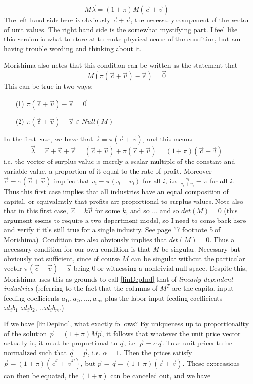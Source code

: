 \documentclass{article}
\theoremstyle{definition}
\theoremstyle{plain}
\theoremstyle{theorem}
\begin{document}
\[ M\vec{\lambda} = (1+\pi)M(\vec{c}+\vec{v}) \]
The left hand side here is obviously $\vec{c}+\vec{v}$, the necessary component of the vector of unit values. The right hand side is the somewhat mystifying part. I feel like this version is what to stare at to make physical sense of the condition, but am having trouble wording and thinking about it. \par 
Morishima also notes that this condition can be written as the statement that 
\[ M(\pi(\vec{c}+\vec{v})-\vec{s}) = \vec{0} \label{linDepInd} \]
This can be true in two ways:
\begin{itemize}
	\item[(1)] $\pi(\vec{c}+\vec{v})-\vec{s} = \vec{0}$ \\
	\item[(2)] $\pi(\vec{c}+\vec{v})-\vec{s} \in Null(M)$ 
\end{itemize}
In the first case, we have that $\vec{s} = \pi(\vec{c}+\vec{v})$, and this means
\[ \vec{\lambda} = \vec{c}+\vec{v}+\vec{s} = (\vec{c}+\vec{v}) + \pi(\vec{c}+\vec{v}) = (1+\pi)(\vec{c}+\vec{v}) \]
i.e. the vector of surplus value is merely a scalar multiple of the constant and variable value, a proportion of it equal to the rate of profit. Moreover $\vec{s} = \pi(\vec{c}+\vec{v})$ implies that $s_i = \pi(c_i+v_i)$ for all $i$, i.e. $\frac{s_i}{c_i+v_i} = \pi$ for all $i$. Thus this first case implies that all industries have an equal composition of capital, or equivalently that profits are proportional to surplus values. Note also that in this first case, $\vec{c} = k\vec{v}$ for some $k$, and so $\ldots$ and so $det(M) = 0$ (this argument seems to require a two department model, so I need to come back here and verify if it's still true for a single industry. See page 77 footnote 5 of Morishima). Condition two also obviously implies that $det(M) = 0$. Thus a necessary condition for our own condition is that $M$ be singular. Necessary but obviously not sufficient, since of course $M$ can be singular without the particular vector $\pi(\vec{c}+\vec{v})-\vec{s}$ being $0$ or witnessing a nontrivial null space. Despite this, Morishima uses this as grounds to call \ref{linDepInd} that of \emph{linearly dependent industries} (referring to the fact that the columns of $M^T$ are the capital input feeding coefficients $a_{1i},a_{2i},\ldots,a_{mi}$ plus the labor input feeding coefficients $\omega l_i b_1,\omega l_i b_2,\ldots \omega l_i b_m$.) \par 
If we have \ref{linDepInd}, what exactly follows? By uniqueness up to proportionality of the solution $\vec{p} = (1+\pi)M\vec{p}$, it follows that whatever the unit price vector actually is, it must be proportional to $\vec{q}$, i.e. $\vec{p} = \alpha\vec{q}$. Take unit prices to be normalized such that $\vec{q} = \vec{p}$, i.e. $\alpha = 1$. Then the prices satisfy $\vec{p} = (1+\pi)(\vec{c}^p + \vec{v}^p)$, but $\vec{p} = \vec{q} = (1+\pi)(\vec{c}+\vec{v})$. These expressions can then be equated, the $(1+\pi)$ can be canceled out, and we have
\end{document}
